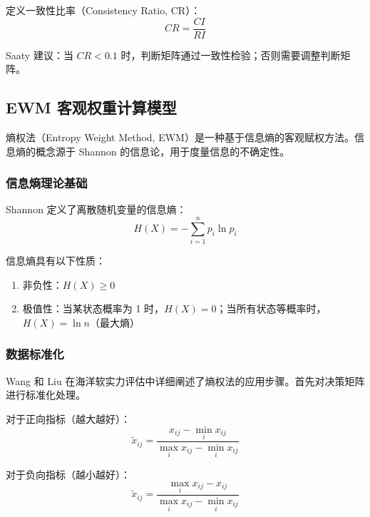 定义一致性比率（Consistency Ratio, CR）：
\begin{equation}
    CR = \frac{CI}{RI}
    \label{eq:cr}
\end{equation}

Saaty\cite{saaty2007analytic} 建议：当 $CR < 0.1$ 时，判断矩阵通过一致性检验；否则需要调整判断矩阵。

\subsection{EWM 客观权重计算模型}
\label{subsec:ewm}

熵权法（Entropy Weight Method, EWM）是一种基于信息熵的客观赋权方法。信息熵的概念源于 Shannon\cite{shannon1948mathematical} 的信息论，用于度量信息的不确定性。

\subsubsection{信息熵理论基础}

Shannon\cite{shannon1948mathematical} 定义了离散随机变量的信息熵：
\begin{equation}
    H(X) = -\sum_{i=1}^{n} p_i \ln p_i
    \label{eq:shannon_entropy}
\end{equation}

信息熵具有以下性质：
\begin{enumerate}
    \item 非负性：$H(X) \geq 0$
    \item 极值性：当某状态概率为 1 时，$H(X) = 0$；当所有状态等概率时，$H(X) = \ln n$（最大熵）
\end{enumerate}

\subsubsection{数据标准化}

Wang 和 Liu\cite{wang2019comprehensive} 在海洋软实力评估中详细阐述了熵权法的应用步骤。首先对决策矩阵进行标准化处理。

对于正向指标（越大越好）：
\begin{equation}
    \tilde{x}_{ij} = \frac{x_{ij} - \min_i x_{ij}}{\max_i x_{ij} - \min_i x_{ij}}
    \label{eq:norm_pos}
\end{equation}

对于负向指标（越小越好）：
\begin{equation}
    \tilde{x}_{ij} = \frac{\max_i x_{ij} - x_{ij}}{\max_i x_{ij} - \min_i x_{ij}}
    \label{eq:norm_neg}
\end{equation}

